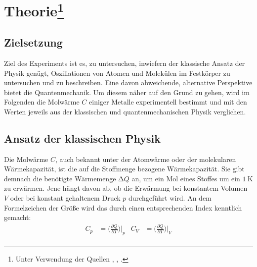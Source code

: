 \section{Theorie\footnote{Unter Verwendung der Quellen \cite{demtroeder}, \cite{Versuchsanleitung}, \cite{gerthsen}.}}
\label{sec:Theorie}
\subsection{Zielsetzung}
    Ziel des Experiments ist es, zu untersuchen, inwiefern der klassische Ansatz der Physik genügt, Oszillationen von 
    Atomen und Molekülen im Festkörper zu untersuchen und zu beschreiben. 
    Eine davon abweichende, alternative Perspektive bietet die Quantenmechanik. 
    Um diesem näher auf den Grund zu gehen, wird im Folgenden die Molwärme $C$ einiger Metalle experimentell bestimmt und 
    mit den Werten jeweils aus der klassischen und quantenmechanischen Physik verglichen. 
\subsection{Ansatz der klassischen Physik}
    Die Molwärme $C$, auch bekannt unter der Atomwärme oder der molekularen Wärmekapazität, ist die auf die 
    Stoffmenge bezogene Wärmekapazität. 
    Sie gibt demnach die benötigte Wärmemenge $\increment Q$ an, um ein Mol eines Stoffes um ein $\SI{1}{\kelvin}$ zu erwärmen.
    Jene hängt davon ab, ob die Erwärmung bei konstantem Volumen $V$ oder bei konstant gehaltenem Druck $p$ durchgeführt 
    wird. An dem Formelzeichen der Größe wird das durch einen entsprechenden Index kenntlich gemacht: 
    \begin{align*}
        C_{p} &= \biggl(\frac{\partial Q}{\partial T}\biggr)\biggl|_{p} &
        C_{V} &= \biggl(\frac{\partial Q}{\partial T}\biggr)\biggl|_{V} \\
    \end{align*}

